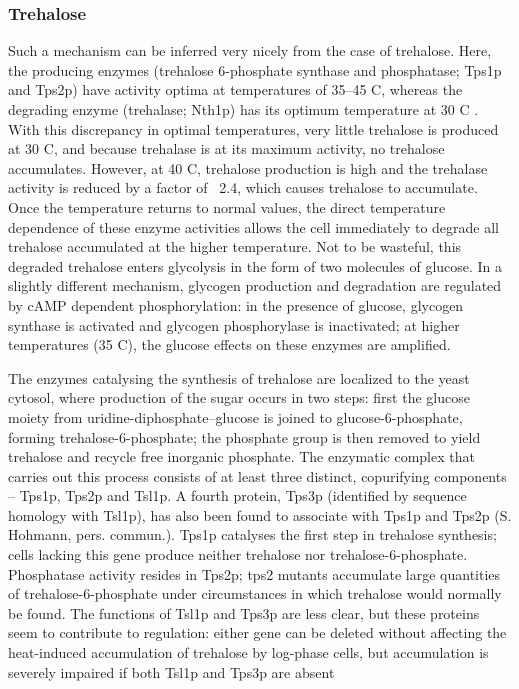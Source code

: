 \documentclass{pracamgr}
\begin{document}
\subsubsection{Trehalose}
Such a mechanism can be inferred very nicely from the case of trehalose. Here, the
producing enzymes (trehalose 6-phosphate synthase and phosphatase; Tps1p and Tps2p) have activity
optima at temperatures of 35–45 C, whereas the degrading enzyme (trehalase; Nth1p) has its optimum
temperature at 30 C . With this discrepancy in optimal temperatures, very little trehalose is
produced at 30 C, and because trehalase is at its maximum activity, no trehalose accumulates.
However, at 40 C, trehalose production is high and the trehalase activity is reduced by a factor of
~2.4, which causes trehalose to accumulate. Once the temperature returns to normal values, the direct
temperature dependence of these enzyme activities allows the cell immediately to degrade all trehalose
accumulated at the higher temperature. Not to be wasteful, this degraded trehalose enters glycolysis in
the form of two molecules of glucose.
In a slightly different mechanism, glycogen production and degradation are regulated by cAMP
dependent phosphorylation: in the presence of glucose, glycogen synthase is activated and glycogen
phosphorylase is inactivated; at higher temperatures (35 C), the glucose effects on these enzymes are
amplified.\cite{OtherModel}


The enzymes catalysing the synthesis of trehalose
are localized to the yeast cytosol, where production of the sugar occurs in two steps: first
the glucose moiety from uridine-diphosphate–glucose
is joined to glucose-6-phosphate, forming trehalose-6-phosphate;
the phosphate group is then removed to
yield trehalose and recycle free inorganic phosphate.
The enzymatic complex that carries out this process
consists of at least three distinct, copurifying components
– Tps1p, Tps2p and Tsl1p. A fourth
protein, Tps3p (identified by sequence homology with
Tsl1p), has also been found to associate with Tps1p and
Tps2p (S. Hohmann, pers. commun.). Tps1p catalyses
the first step in trehalose synthesis; cells lacking this
gene produce neither trehalose nor trehalose-6-phosphate.
Phosphatase activity resides in Tps2p;
tps2 mutants accumulate large quantities of 
trehalose-6-phosphate under circumstances in which trehalose
would normally be found. The functions of Tsl1p and
Tps3p are less clear, but these proteins seem to 
contribute to regulation: either gene can be deleted 
without affecting the heat-induced accumulation of 
trehalose by log-phase cells, but accumulation is severely
impaired if both Tsl1p and Tps3p are absent \cite{YinYangTrehalose}
\end{document}
